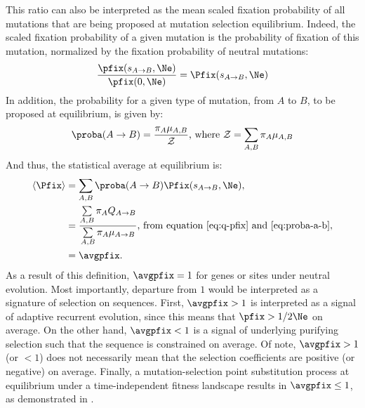This ratio can also be interpreted as the mean scaled fixation probability of all mutations that are being proposed at mutation selection equilibrium.
Indeed, the scaled fixation probability of a given mutation is the probability of fixation of this mutation, normalized by the fixation probability of neutral mutations:
\begin{align}
    \dfrac{\pfix (s_{A \to B}, \Ne)}{\pfix (0, \Ne)} = \Pfix (s_{A \to B}, \Ne)
\end{align}
In addition, the probability for a given type of mutation, from $A$ to $B$, to be proposed at equilibrium, is given by:
\begin{align}
    \proba (A \to B) = \dfrac{\pi_{A}  \mu_{A, B}}{ \mathcal{Z}} \text{, where } \mathcal{Z} = \sum\limits_{A, B} \pi_{A} \mu_{A, B} \label{eq:proba-a-b}
\end{align}
And thus, the statistical average at equilibrium is:
\begin{align}
    \left\langle \Pfix \right\rangle & = \sum\limits_{A, B}  \proba (A \to B) \Pfix (s_{A \to B}, \Ne), \\
    & = \dfrac{ \sum\limits_{A, B} \pi_{A} Q_{A \to B}}{\sum\limits_{A, B} \pi_{A} \mu_{A \to B}} \text{, from equation~\ref{eq:q-pfix} and~\ref{eq:proba-a-b}}, \\
    & = \avgpfix.
\end{align}
As a result of this definition, $\avgpfix=1$ for genes or sites under neutral evolution.
Most importantly, departure from $1$ would be interpreted as a signature of selection on sequences.
First, $\avgpfix>1$ is interpreted as a signal of adaptive recurrent evolution, since this means that $\pfix > 1/2 \Ne$ on average.
On the other hand, $\avgpfix<1$ is a signal of underlying purifying selection such that the sequence is constrained on average.
Of note, $ \avgpfix > 1$ (or $ < 1$) does not necessarily mean that the selection coefficients are positive (or negative) on average.
Finally, a mutation-selection point substitution process at equilibrium under a time-independent fitness landscape results in $\avgpfix \leq 1$, as demonstrated in \citet{Spielman2015}.